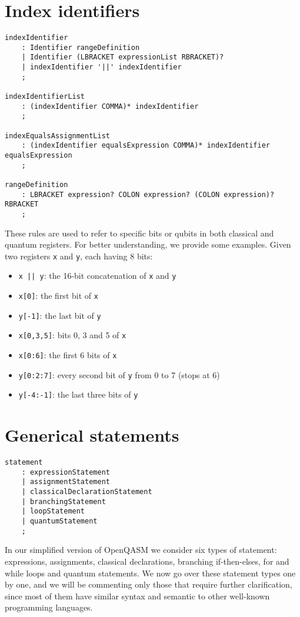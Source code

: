 \documentclass[12pt,a4paper]{report}
\theoremstyle{definition}
\theoremstyle{definition}
\theoremstyle{definition}
\begin{document}
\section{Index identifiers}
\begin{lstlisting}
indexIdentifier
    : Identifier rangeDefinition
    | Identifier (LBRACKET expressionList RBRACKET)?
    | indexIdentifier '||' indexIdentifier
    ;

indexIdentifierList
    : (indexIdentifier COMMA)* indexIdentifier
    ;

indexEqualsAssignmentList
    : (indexIdentifier equalsExpression COMMA)* indexIdentifier equalsExpression
    ;

rangeDefinition
    : LBRACKET expression? COLON expression? (COLON expression)? RBRACKET
    ;
\end{lstlisting}
These rules are used to refer to specific bits or qubits in both classical and quantum registers. For better understanding, we provide some examples. Given two registers \texttt{x} and \texttt{y}, each having 8 bits:
\begin{itemize}
    \itemsep 0em
    \item \texttt{x || y}: the 16-bit concatenation of \texttt{x} and \texttt{y}
    \item \texttt{x[0]}: the first bit of \texttt{x}
    \item \texttt{y[-1]}: the last bit of \texttt{y}
    \item \texttt{x[0,3,5]}: bits 0, 3 and 5 of \texttt{x}
    \item \texttt{x[0:6]}: the first 6 bits of \texttt{x}
    \item \texttt{y[0:2:7]}: every second bit of \texttt{y} from 0 to 7 (stops at 6)
    \item \texttt{y[-4:-1]}: the last three bits of \texttt{y}
\end{itemize}



\section{Generical statements}
\begin{lstlisting}
statement
    : expressionStatement
    | assignmentStatement
    | classicalDeclarationStatement
    | branchingStatement
    | loopStatement
    | quantumStatement
    ;
\end{lstlisting}
In our simplified version of OpenQASM we consider six types of statement: expressions, assignments, classical declarations, branching if-then-elses, for and while loops and quantum statements. We now go over these statement types one by one, and we will be commenting only those that require further clarification, since most of them have similar syntax and semantic to other well-known programming languages.\\
\end{document}
